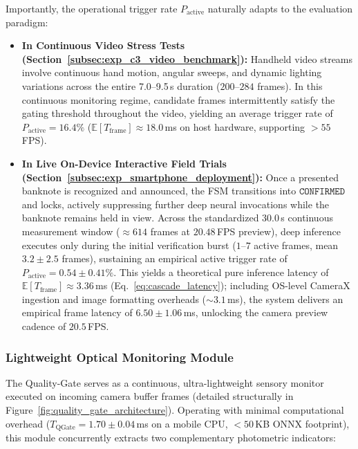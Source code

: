 \documentclass[final,5p,times,twocolumn,authoryear]{elsarticle}
\begin{document}
Importantly, the operational trigger rate $P_{\text{active}}$ naturally adapts to the evaluation paradigm:
\begin{itemize}
    \item \textbf{In Continuous Video Stress Tests (Section~\ref{subsec:exp_c3_video_benchmark}):} Handheld video streams involve continuous hand motion, angular sweeps, and dynamic lighting variations across the entire 7.0--9.5\,s duration ($200$--$284$ frames). In this continuous monitoring regime, candidate frames intermittently satisfy the gating threshold throughout the video, yielding an average trigger rate of $P_{\text{active}} = 16.4\%$ ($\mathbb{E}[T_{\text{frame}}] \approx 18.0$\,ms on host hardware, supporting $>55$\,FPS).
    \item \textbf{In Live On-Device Interactive Field Trials (Section~\ref{subsec:exp_smartphone_deployment}):} Once a presented banknote is recognized and announced, the FSM transitions into $\texttt{CONFIRMED}$ and locks, actively suppressing further deep neural invocations while the banknote remains held in view. Across the standardized $30.0$\,s continuous measurement window ($\approx 614$ frames at $20.48$\,FPS preview), deep inference executes only during the initial verification burst ($1$--$7$ active frames, mean $3.2 \pm 2.5$ frames), sustaining an empirical active trigger rate of $P_{\text{active}} = 0.54 \pm 0.41\%$. This yields a theoretical pure inference latency of $\mathbb{E}[T_{\text{frame}}] \approx 3.36$\,ms (Eq.~\ref{eq:cascade_latency}); including OS-level CameraX ingestion and image formatting overheads ($\sim 3.1$\,ms), the system delivers an empirical frame latency of $6.50 \pm 1.06$\,ms, unlocking the camera preview cadence of $20.5$\,FPS.
\end{itemize}

\subsubsection{Lightweight Optical Monitoring Module}
\label{subsubsec:quality_gate}
The Quality-Gate serves as a continuous, ultra-lightweight sensory monitor executed on incoming camera buffer frames (detailed structurally in Figure~\ref{fig:quality_gate_architecture}). Operating with minimal computational overhead ($T_{\text{QGate}} = 1.70 \pm 0.04$\,ms on a mobile CPU, $<50$\,KB ONNX footprint), this module concurrently extracts two complementary photometric indicators:
\end{document}
